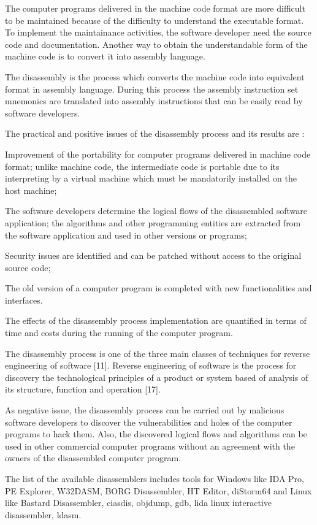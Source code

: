 The computer programs delivered in the machine code format are more difficult to be maintained because of the difficulty to understand the executable format. To implement the maintainance activities, the software developer need the source code and documentation. Another way to obtain 
the understandable form of the machine code is to convert it into assembly language.

The disassembly is the process which converts the machine code into equivalent format in assembly language. During this process the assembly instruction set mnemonics are translated into assembly
instructions that can be easily read by software developers.

The practical and positive issues of the disassembly process and its results are :

Improvement of the portability for computer programs delivered in machine code format; unlike machine code, the intermediate code is portable due to its interpreting by a virtual machine which must be mandatorily installed on the host machine;

The software developers determine the logical flows of the disassembled software application; the algorithms and other programming entities are extracted from the software application and used in other versions or programs;

Security issues are identified and can be patched without access to the original source code;

The old version of a computer program is completed with new functionalities and interfaces.

The effects of the disassembly process implementation are quantified in terms of time and costs during the running of the computer program.

The disassembly process is one of the three main classes of techniques for reverse engineering of software [11]. Reverse engineering of software is the process for discovery the technological
principles of a product or system based of analysis of its structure, function and operation [17].

As negative issue, the disassembly process can be carried out by malicious software developers to discover the vulnerabilities and holes of the computer programs to hack them. Also, the discovered logical flows and algorithms can be used in other commercial computer programs without an
agreement with the owners of the disassembled computer program.

The list of the available disassemblers includes tools for Windows like IDA Pro, PE Explorer, W32DASM, BORG Disassembler, HT Editor, diStorm64 and Linux like Bastard Disassembler, ciasdis, objdump, gdb, lida linux interactive disassembler, ldasm.

